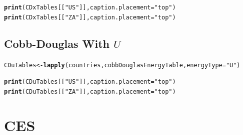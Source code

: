 \documentclass[preprint,authoryear,12pt]{elsarticle}\usepackage{graphicx, color}
\makeatletter
\newcommand{\hlfunctioncall}[1]{\textcolor[rgb]{0.501960784313725,0,0.329411764705882}{\textbf{#1}}}%
\newcommand{\hlstring}[1]{\textcolor[rgb]{0.6,0.6,1}{#1}}%
\newenvironment{kframe}{%
 \def\at@end@of@kframe{}%
 \ifinner\ifhmode%
  \def\at@end@of@kframe{\end{minipage}}%
  \begin{minipage}{\columnwidth}%
 \fi\fi%
 \def\FrameCommand##1{\hskip\@totalleftmargin \hskip-\fboxsep
 \colorbox{shadecolor}{##1}\hskip-\fboxsep
     \hskip-\linewidth \hskip-\@totalleftmargin \hskip\columnwidth}%
 \MakeFramed {\advance\hsize-\width
   \@totalleftmargin\z@ \linewidth\hsize
   \@setminipage}}%
 {\par\unskip\endMakeFramed%
 \at@end@of@kframe}
\newenvironment{knitrout}{}{} %
\makeatother
\begin{document}
\begin{kframe}
\begin{alltt}
\hlfunctioncall{print}(CDxTables[[\hlstring{"US"}]], caption.placement=\hlstring{"top"})
\hlfunctioncall{print}(CDxTables[[\hlstring{"ZA"}]], caption.placement=\hlstring{"top"})
\end{alltt}
\end{kframe}


\subsection{Cobb-Douglas With $U$}

\begin{knitrout}
\color{fgcolor}\begin{kframe}
\begin{alltt}
CDuTables <- \hlfunctioncall{lapply}(countries, cobbDouglasEnergyTable, energyType=\hlstring{"U"})
\end{alltt}
\end{kframe}
\end{knitrout}


\begin{kframe}
\begin{alltt}
\hlfunctioncall{print}(CDuTables[[\hlstring{"US"}]], caption.placement=\hlstring{"top"})
\hlfunctioncall{print}(CDuTables[[\hlstring{"ZA"}]], caption.placement=\hlstring{"top"})
\end{alltt}
\end{kframe}


\section{CES}
\end{document}
